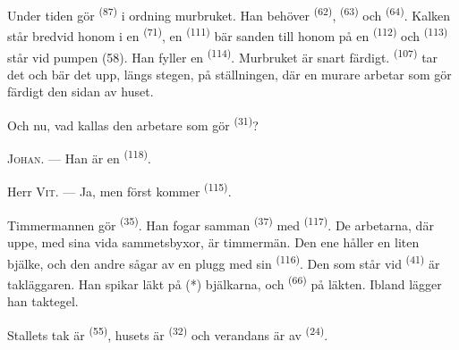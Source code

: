 Under tiden gör  \textsuperscript{(87)} i ordning murbruket. Han behöver
 \textsuperscript{(62)},  \textsuperscript{(63)} och 
\textsuperscript{(64)}. Kalken står bredvid honom i en  \textsuperscript{(71)},
en
 \textsuperscript{(111)} bär sanden till honom på en
 \textsuperscript{(112)} och 
\textsuperscript{(113)} står vid pumpen (58). Han fyller en 
\textsuperscript{(114)}. Murbruket är snart färdigt. 
\textsuperscript{(107)} tar det och bär det upp, längs stegen, på ställningen, där en murare
arbetar som gör färdigt den sidan av huset.

Och nu, vad kallas den arbetare som gör  \textsuperscript{(31)}?

\textsc{Johan}. --- Han är en  \textsuperscript{(118)}.

\VUsaut{3.0mm}
\VUsaut{3.0mm}

Herr \textsc{Vit}. --- Ja, men först kommer  \textsuperscript{(115)}.

Timmermannen gör  \textsuperscript{(35)}. Han fogar samman
 \textsuperscript{(37)} med 
\textsuperscript{(117)}. De arbetarna, där uppe, med sina vida sammetsbyxor, är timmermän. Den
ene håller en liten bjälke, och den andre sågar av en plugg med sin 
\textsuperscript{(116)}. Den som står vid  \textsuperscript{(41)} är
takläggaren. Han spikar läkt på (*) bjälkarna, och
 \textsuperscript{(66)} på läkten. Ibland lägger han taktegel.


Stallets tak är  \textsuperscript{(55)}, husets är
 \textsuperscript{(32)} och verandans är av 
\textsuperscript{(24)}.


